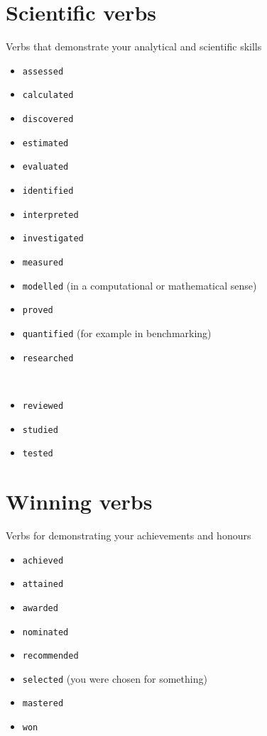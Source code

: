 \documentclass[
]{book}
\providecommand{\tightlist}{%
  \setlength{\itemsep}{0pt}\setlength{\parskip}{0pt}}
\begin{document}
\hypertarget{scientific}{%
\section{Scientific verbs}\label{scientific}}

Verbs that demonstrate your analytical and scientific skills

\begin{itemize}
\tightlist
\item
  \texttt{assessed}
\item
  \texttt{calculated}
\item
  \texttt{discovered}
\item
  \texttt{estimated}
\item
  \texttt{evaluated}
\item
  \texttt{identified}
\item
  \texttt{interpreted}
\item
  \texttt{investigated}
\item
  \texttt{measured}
\item
  \texttt{modelled} (in a computational or mathematical sense)
\item
  \texttt{proved}
\item
  \texttt{quantified} (for example in benchmarking)
\item
  \texttt{researched}\strut \\
\item
  \texttt{reviewed}
\item
  \texttt{studied}
\item
  \texttt{tested}
\end{itemize}

\hypertarget{winning}{%
\section{Winning verbs}\label{winning}}

Verbs for demonstrating your achievements and honours

\begin{itemize}
\tightlist
\item
  \texttt{achieved}
\item
  \texttt{attained}
\item
  \texttt{awarded}
\item
  \texttt{nominated}
\item
  \texttt{recommended}
\item
  \texttt{selected} (you were chosen for something)
\item
  \texttt{mastered}
\item
  \texttt{won}
\end{itemize}
\end{document}

